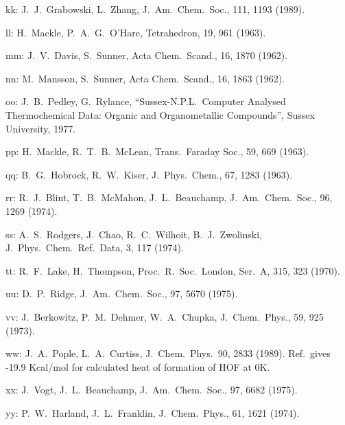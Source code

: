 \begin{description}
\item{  kk: } J.\ J.\ Grabowski, L.\ Zhang, J.\ Am.\ Chem.\ Soc., 111, 1193 (1989).
  
\item{  ll: } H.\ Mackle, P.\ A.\ G.\ O'Hare, Tetrahedron, 19, 961 (1963).
  
\item{  mm: } J.\ V.\ Davis, S.\ Sunner, Acta Chem.\ Scand., 16, 1870 (1962).
  
\item{  nn: } M.\ Mansson, S.\ Sunner, Acta Chem.\ Scand., 16, 1863 (1962).
  
\item{  oo: } J.\ B.\ Pedley, G.\ Rylance, ``Sussex-N.P.L.\ Computer Analysed Thermochemical
       Data: Organic and Organometallic Compounds'', Sussex University, 1977.
  
\item{  pp: } H.\ Mackle, R.\ T.\ B.\ McLean, Trans.\ Faraday Soc., 59, 669 (1963).
  
\item{  qq: } B.\ G.\ Hobrock, R.\ W.\ Kiser, J.\ Phys.\ Chem., 67, 1283 (1963).
  
\item{  rr: } R.\ J.\ Blint, T.\ B.\ McMahon, J.\ L.\ Beauchamp, J.\ Am.\ Chem.\ Soc., 96, 1269
       (1974).
  
\item{  ss: } A.\ S.\ Rodgers, J.\ Chao, R.\ C.\ Wilhoit, B.\ J.\ Zwolinski, J.\ Phys.\ Chem.\
       Ref.\ Data, 3, 117 (1974).
  
\item{  tt: } R.\ F.\ Lake, H.\ Thompson, Proc.\ R.\ Soc.\ London, Ser.\ A, 315, 323 (1970).
  
\item{  uu: } D.\ P.\ Ridge, J.\ Am.\ Chem.\ Soc., 97, 5670 (1975).
  
\item{  vv: } J.\ Berkowitz, P.\ M.\ Dehmer, W.\ A.\ Chupka, J.\ Chem.\ Phys., 59, 925 (1973).
  
\item{  ww: } J.\ A.\ Pople, L.\ A.\ Curtiss, J.\ Chem.\ Phys.\ 90, 2833 (1989). Ref.\ gives -19.9
       Kcal/mol for calculated heat of formation of HOF at 0K.
  
\item{  xx: } J.\ Vogt, J.\ L.\ Beauchamp, J.\ Am.\ Chem.\ Soc., 97, 6682 (1975).
  
\item{  yy: } P.\ W.\ Harland, J.\ L.\ Franklin, J.\ Chem.\ Phys., 61, 1621 (1974).
  

\end{description}
